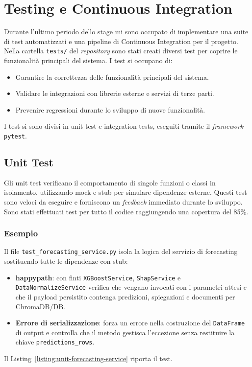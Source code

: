\chapter{Testing e Continuous Integration}
\label{chap:testing}
Durante l'ultimo periodo dello stage mi sono occupato di implementare una suite di test automatizzati e una pipeline di Continuous Integration per il progetto.
Nella cartella \texttt{tests/} del \textit{repository} sono stati creati diversi test per coprire le funzionalità principali del sistema.
I test si occupano di:
\begin{itemize}
    \item Garantire la correttezza delle funzionalità principali del sistema.
    \item Validare le integrazioni con librerie esterne e servizi di terze parti.
    \item Prevenire regressioni durante lo sviluppo di nuove funzionalità.
\end{itemize}
I test si sono divisi in unit test e integration tests, eseguiti tramite il \textit{framework} \texttt{pytest}.

\section{Unit Test}
Gli unit test verificano il comportamento di singole funzioni o classi in isolamento, utilizzando mock e stub per simulare dipendenze esterne. Questi test sono veloci da eseguire e forniscono un \textit{feedback} immediato durante lo sviluppo.
Sono stati effettuati test per tutto il codice raggiungendo una copertura del 85\%.
\subsection{Esempio}
Il file \texttt{test\_forecasting\_service.py} isola la logica del servizio di forecasting sostituendo tutte le dipendenze con stub:
\begin{itemize}
    \item \textbf{\gls{happypath}}: con finti \texttt{XGBoostService}, \texttt{ShapService} e \texttt{DataNormalizeService} verifica che vengano invocati con i parametri attesi e che il payload persistito contenga predizioni, spiegazioni e documenti per ChromaDB/DB.
    \item \textbf{Errore di serializzazione}: forza un errore nella costruzione del \texttt{DataFrame} di output e controlla che il metodo gestisca l’eccezione senza restituire la chiave \texttt{predictions\_rows}.
\end{itemize}
Il Listing~\ref{listing:unit-forecasting-service} riporta il test.
\captionsetup{type=listing, belowskip=0pt}
\inputminted[fontsize=\small, breaklines, breakanywhere=true, linenos=true, bgcolor=gray!10]{python}{code/tests/test_forecasting_service.py}
\label{listing:unit-forecasting-service}

